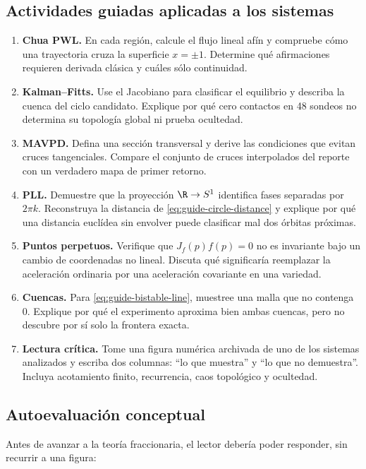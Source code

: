 \subsection{Actividades guiadas aplicadas a los sistemas}

\begin{enumerate}[label=\textbf{A\arabic*.}]
 \item \textbf{Chua PWL.} En cada región, calcule el flujo lineal afín y
 compruebe cómo una trayectoria cruza la superficie $x=\pm1$. Determine qué
 afirmaciones requieren derivada clásica y cuáles sólo continuidad.
 \item \textbf{Kalman--Fitts.} Use el Jacobiano para clasificar el equilibrio y
 describa la cuenca del ciclo candidato. Explique por qué cero contactos en 48
 sondeos no determina su topología global ni prueba ocultedad.
 \item \textbf{MAVPD.} Defina una sección transversal y derive las condiciones
 que evitan cruces tangenciales. Compare el conjunto de cruces interpolados
 del reporte con un verdadero mapa de primer retorno.
 \item \textbf{PLL.} Demuestre que la proyección $\R\to S^1$ identifica fases
 separadas por $2\pi k$. Reconstruya la distancia de
 \cref{eq:guide-circle-distance} y explique por qué una distancia euclídea
 sin envolver puede clasificar mal dos órbitas próximas.
 \item \textbf{Puntos perpetuos.} Verifique que $J_f(p)f(p)=0$ no es invariante
 bajo un cambio de coordenadas no lineal. Discuta qué significaría reemplazar
 la aceleración ordinaria por una aceleración covariante en una variedad.
 \item \textbf{Cuencas.} Para \cref{eq:guide-bistable-line}, muestree una malla
 que no contenga $0$. Explique por qué el experimento aproxima bien ambas
 cuencas, pero no descubre por sí solo la frontera exacta.
 \item \textbf{Lectura crítica.} Tome una figura numérica archivada de uno de
 los sistemas analizados y escriba
 dos columnas: ``lo que muestra'' y ``lo que no demuestra''. Incluya
 acotamiento finito, recurrencia, caos topológico y ocultedad.
\end{enumerate}

\subsection{Autoevaluación conceptual}

Antes de avanzar a la teoría fraccionaria, el lector debería poder responder,
sin recurrir a una figura:

